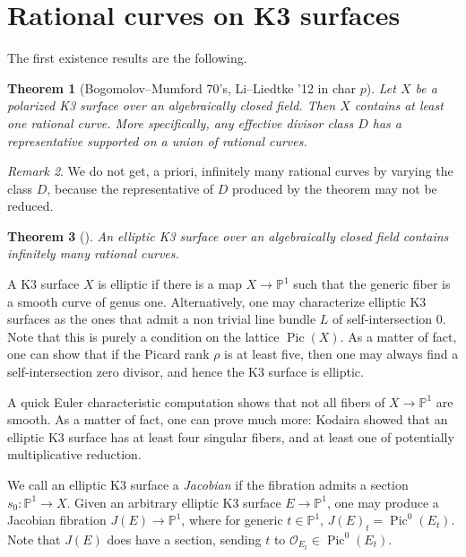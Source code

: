 \documentclass{amsart}
\theoremstyle{plain}
\newtheorem{theorem}{Theorem}[section]
\theoremstyle{definition}
\theoremstyle{remark}
\newtheorem{remark}[theorem]{Remark}
\DeclareMathOperator{\Pic}{Pic}
\begin{document}
\section{Rational curves on K3 surfaces} %
\label{sec:rational_curves_on_k3_surfaces}

The first existence results are the following.
\begin{theorem}[Bogomolov--Mumford 70's, Li--Liedtke '12 in char $p$]
\label{theorem:bogomolov-mumford}
Let $X$ be a polarized K3 surface over an algebraically closed field.
Then $X$ contains at least one rational curve.
 More specifically, any effective divisor class $D$ has a representative supported on a union of
 rational curves. 
\end{theorem}
\begin{remark}
We do not get, a priori, infinitely many rational curves by varying the class $D$, 
because the representative of $D$ produced by the theorem may not be reduced.
\end{remark}

\begin{theorem}[\cite{BT}]
\label{theorem:bogomolov-tschinkel}
An elliptic K3 surface over an algebraically closed field contains infinitely many rational curves.
\end{theorem}

A K3 surface $X$ is elliptic if there is a map $X \to \mathbb{P}^1$ such that the generic
fiber is a smooth curve of genus one. Alternatively, one may characterize elliptic K3 surfaces as the ones that admit a non trivial line bundle $L$ of self-intersection $0$. Note that this is purely a condition on
the lattice $\Pic(X)$. As a matter of fact, one can show that if the Picard rank $\rho$ is at least five, then one may always find a self-intersection zero divisor, and hence the K3 surface is elliptic.

A quick Euler characteristic computation shows that not all fibers of $X \to \mathbb{P}^1$ are smooth.
As a matter of fact, one can prove much more: Kodaira showed that an elliptic K3 surface has at least
four singular fibers, and at least one of potentially multiplicative reduction.

We call an elliptic K3 surface a \emph{Jacobian} if
the fibration admits a section $s_0:\mathbb{P}^1 \to X$. Given an arbitrary elliptic
K3 surface $E \to \mathbb{P}^1$, one may produce a Jacobian fibration $J(E) \to \mathbb{P}^1$,
where for generic $t \in \mathbb{P}^1$,
$J(E)_t = \Pic^0(E_t)$. Note that $J(E)$ does have a section, sending $t$ to $\mathcal{O}_{E_t} \in \Pic^0(E_t)$.
\end{document}
